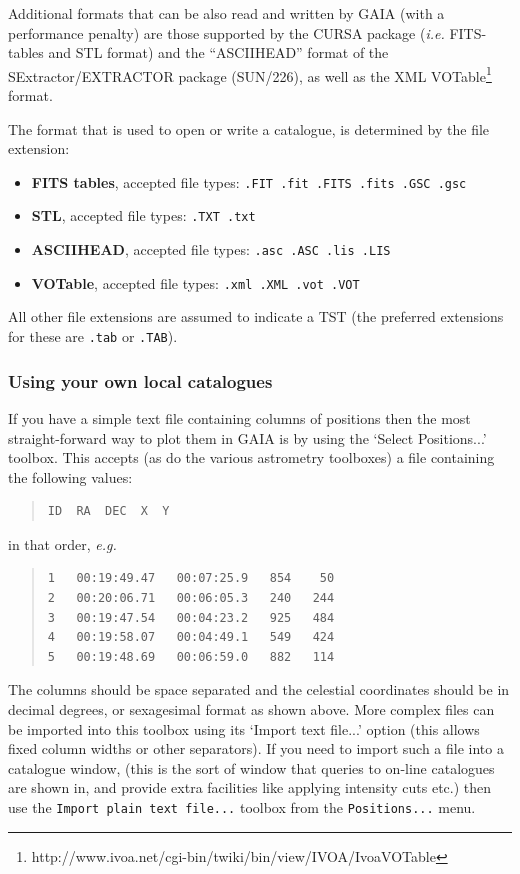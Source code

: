 \documentclass[twoside,11pt]{article}
\newcommand{\htmladdnormallinkfoot}[2]{#1\footnote{#2}}
\newcommand{\xref}[3]{#1}
\renewcommand{\_}{\texttt{\symbol{95}}}
\newcommand{\mytt}[1]{{\texttt{#1}}}
\newcommand{\mybold}[1]{{\textbf{#1}}}
\begin{document}
Additional formats that can be also read and written by GAIA (with a
performance penalty) are those supported by the \xref{CURSA}{sun190}{}
package (\textit{i.e.} FITS-tables and STL format) and the
``ASCII\_HEAD'' format of the SExtractor/EXTRACTOR package
(\xref{SUN/226}{sun226}{}), as well as the XML
\htmladdnormallinkfoot{VOTable}{http://www.ivoa.net/cgi-bin/twiki/bin/view/IVOA/IvoaVOTable}
format.

The format that is used to open or write a catalogue, is determined by
the file extension:
\begin{itemize}
\item \mybold{FITS tables}, accepted file types: \mytt{.FIT .fit .FITS .fits .GSC .gsc}
\item \mybold{STL}, accepted file types: \mytt{.TXT .txt}
\item \mybold{ASCII\_HEAD}, accepted file types: \mytt{.asc .ASC .lis .LIS}
\item \mybold{VOTable}, accepted file types: \mytt{.xml .XML .vot .VOT}
\end{itemize}
All other file extensions are assumed to indicate a TST (the preferred
extensions for these are \mytt{.tab} or \mytt{.TAB}).

\subsubsection{Using your own local catalogues}
If you have a simple text file containing columns of positions then
the most straight-forward way to plot them in GAIA is by using the
`Select Positions...' toolbox. This accepts (as do the various
astrometry toolboxes) a file containing the following values:
\begin{quote}
\begin{verbatim}
ID  RA  DEC  X  Y
\end{verbatim}
\end{quote}
in that order, \textit{e.g.}
\begin{quote}
\begin{verbatim}
1   00:19:49.47   00:07:25.9   854    50
2   00:20:06.71   00:06:05.3   240   244
3   00:19:47.54   00:04:23.2   925   484
4   00:19:58.07   00:04:49.1   549   424
5   00:19:48.69   00:06:59.0   882   114
\end{verbatim}
\end{quote}
The columns should be space separated and the celestial coordinates
should be in decimal degrees, or sexagesimal format as shown above. More
complex files can be imported into this toolbox using its `Import text
file...'  option (this allows fixed column widths or other
separators). If you need to import such a file into a catalogue window,
(this is the sort of window that queries to on-line catalogues are shown
in, and provide extra facilities like applying intensity cuts etc.) then
use the
\mytt{Import plain text file...} toolbox from the \mytt{Positions...} menu.
\end{document}
